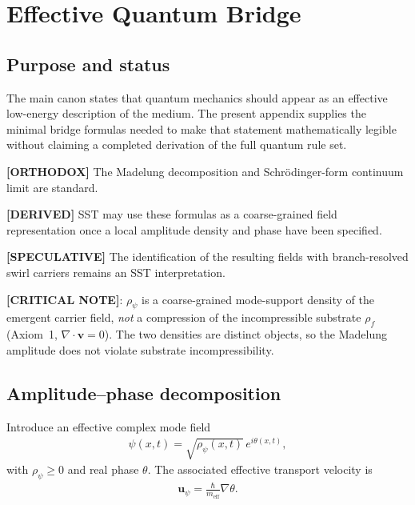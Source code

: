 \documentclass[11pt]{article}
\theoremstyle{definition}
\theoremstyle{plain}
\theoremstyle{remark}
\newcommand{\rhoF}{{\rho_{\!f}}}
\begin{document}
    \section{Effective Quantum Bridge}
    \label{sec:appendix_quantum_bridge}
    
    \subsection{Purpose and status}
        The main canon states that quantum mechanics should appear as an effective low-energy description of the medium. The present appendix supplies the minimal bridge formulas needed to make that statement mathematically legible without claiming a completed derivation of the full quantum rule set.
        
        \textbf{[ORTHODOX]} The Madelung decomposition and Schr\"odinger-form continuum limit are standard.
        
        \textbf{[DERIVED]} SST may use these formulas as a coarse-grained field representation once a local amplitude density and phase have been specified.
        
        \textbf{[SPECULATIVE]} The identification of the resulting fields with branch-resolved swirl carriers remains an SST interpretation.

        \textbf{[CRITICAL NOTE]}: $\rho_\psi$ is a coarse-grained mode-support density of the emergent carrier field, \emph{not} a compression of the incompressible substrate $\rhoF$ (Axiom~1, $\nabla\cdot\mathbf v=0$). The two densities are distinct objects, so the Madelung amplitude does not violate substrate incompressibility.
    
    \subsection{Amplitude--phase decomposition}
        Introduce an effective complex mode field
        \begin{align}
            \psi(x,t) = \sqrt{\rho_\psi(x,t)}\,e^{i\theta(x,t)},
            \label{eq:madelung_ansatz_appendix}
        \end{align}
        with \(\rho_\psi \ge 0\) and real phase \(\theta\). The associated effective transport velocity is
        \begin{align}
            \mathbf{u}_\psi
            =
            \frac{\hbar}{m_{\mathrm{eff}}}\nabla\theta.
            \label{eq:effective_phase_velocity}
        \end{align}
        
\end{document}
